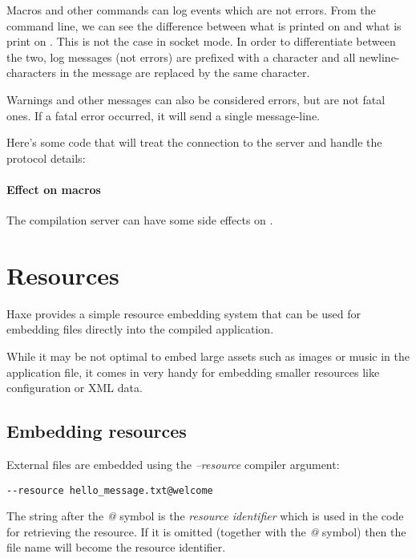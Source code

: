 Macros and other commands can log events which are not errors. From the command line, we can see the difference between what is printed on  and what is print on . This is not the case in socket mode. In order to differentiate between the two, log messages (not errors) are prefixed with a  character and all newline-characters in the message are replaced by the same  character.

Warnings and other messages can also be considered errors, but are not fatal ones. If a fatal error occurred, it will send a single  message-line.

Here's some code that will treat the connection to the server and handle the protocol details:


\paragraph{Effect on macros}
The compilation server can have some side effects on .



\section{Resources}
\label{cr-resources}

Haxe provides a simple resource embedding system that can be used for embedding files directly into the compiled application.

While it may be not optimal to embed large assets such as images or music in the application file, it comes in very handy for embedding smaller resources like configuration or XML data.

\subsection{Embedding resources}
\label{cr-resources-embed}

External files are embedded using the \emph{--resource} compiler argument:

\begin{lstlisting}
--resource hello_message.txt@welcome
\end{lstlisting}

The string after the \emph{@} symbol is the \emph{resource identifier} which is used in the code for retrieving the resource. If it is omitted (together with the \emph{@} symbol) then the file name will become the resource identifier.

